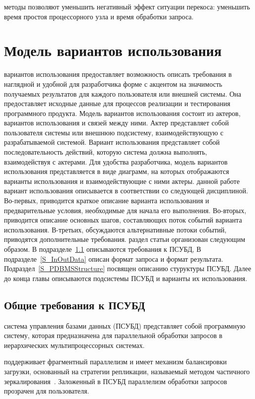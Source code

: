 \documentclass[11pt,oneside]{article}
\begin{document}
 методы позволяют уменьшить негативный эффект ситуации перекоса: уменьшить время простоя процессорного узла и время обработки запроса.

\section{Модель вариантов использования}\label{S_UseCaseModel}
 вариантов использования предоставляет возможность описать требования в наглядной и удобной для разработчика форме с акцентом на значимость получаемых результатов для каждого пользователя или внешней системы. Она предоставляет исходные данные для процессов реализации и тестирования программного продукта. Модель вариантов использования состоит из актеров, вариантов использования и связей между ними. Актер представляет собой пользователя системы или внешнюю подсистему, взаимодействующую с разрабатываемой системой. Вариант использования представляет собой последовательность действий, которую система должна выполнять, взаимодействуя с актерами. Для удобства разработчика, модель вариантов использования представляется в виде диаграмм, на которых отображаются варианты использования и взаимодействующие с ними актеры.
 данной работе вариант использования  описывается в соответствии со следующей дисциплиной. Во-первых, приводится краткое описание варианта использования и предварительные условия, необходимые для начала его выполнения. Во-вторых, приводится описание основных шагов, составляющих поток событий варианта использования. В-третьих, обсуждаются альтернативные потоки событий, приводятся дополнительные требования.
 раздел статьи организован следующим образом. В подразделе~\ref{S_PDBMSRequirements} описываются требования к ПСУБД, В подразделе~\ref{S_InOutData} описан формат запроса и формат результата. Подраздел~\ref{S_PDBMSStructure} посвящен описанию стуруктуры ПСУБД. Далее до конца главы описываются подсистемы ПСУБД и варианты их использования.

\subsection{Общие требования к ПСУБД}\label{S_PDBMSRequirements}
 система управления базами данных (ПСУБД) представляет собой программную систему, которая предназначена для параллельной обработки запросов в иерархических мультипроцессорных системах.

 поддерживает фрагментный параллелизм и имеет механизм балансировки загрузки, основанный на стратегии репликации, называемый методом частичного зеркалирования~\cite{B_Lepikhov2006}. Заложенный в ПСУБД параллелизм обработки запросов прозрачен для пользователя.
\end{document}

